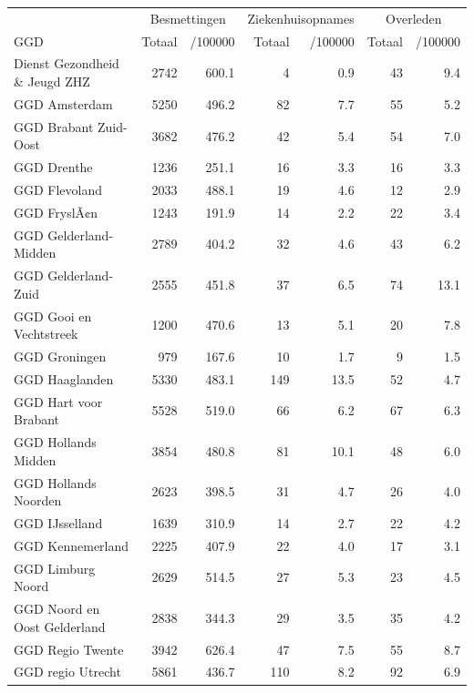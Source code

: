 \documentclass[
  english,
  man,floatsintext]{apa6}
\begin{document}
\begin{table}[H]
\centering\begingroup\fontsize{10}{12}\selectfont

\begin{threeparttable}
\begin{tabular}{lrrrrrr}
\toprule
\multicolumn{1}{c}{ } & \multicolumn{2}{c}{Besmettingen} & \multicolumn{2}{c}{Ziekenhuisopnames} & \multicolumn{2}{c}{Overleden} \\
\cmidrule(l{3pt}r{3pt}){2-3} \cmidrule(l{3pt}r{3pt}){4-5} \cmidrule(l{3pt}r{3pt}){6-7}
GGD & Totaal & /100000 & Totaal & /100000 & Totaal & /100000\\
\midrule
Dienst Gezondheid \& Jeugd ZHZ & 2742 & 600.1 & 4 & 0.9 & 43 & 9.4\\
GGD Amsterdam & 5250 & 496.2 & 82 & 7.7 & 55 & 5.2\\
GGD Brabant Zuid-Oost & 3682 & 476.2 & 42 & 5.4 & 54 & 7.0\\
GGD Drenthe & 1236 & 251.1 & 16 & 3.3 & 16 & 3.3\\
GGD Flevoland & 2033 & 488.1 & 19 & 4.6 & 12 & 2.9\\
GGD FryslÃ¢n & 1243 & 191.9 & 14 & 2.2 & 22 & 3.4\\
GGD Gelderland-Midden & 2789 & 404.2 & 32 & 4.6 & 43 & 6.2\\
GGD Gelderland-Zuid & 2555 & 451.8 & 37 & 6.5 & 74 & 13.1\\
GGD Gooi en Vechtstreek & 1200 & 470.6 & 13 & 5.1 & 20 & 7.8\\
GGD Groningen & 979 & 167.6 & 10 & 1.7 & 9 & 1.5\\
GGD Haaglanden & 5330 & 483.1 & 149 & 13.5 & 52 & 4.7\\
GGD Hart voor Brabant & 5528 & 519.0 & 66 & 6.2 & 67 & 6.3\\
GGD Hollands Midden & 3854 & 480.8 & 81 & 10.1 & 48 & 6.0\\
GGD Hollands Noorden & 2623 & 398.5 & 31 & 4.7 & 26 & 4.0\\
GGD IJsselland & 1639 & 310.9 & 14 & 2.7 & 22 & 4.2\\
GGD Kennemerland & 2225 & 407.9 & 22 & 4.0 & 17 & 3.1\\
GGD Limburg Noord & 2629 & 514.5 & 27 & 5.3 & 23 & 4.5\\
GGD Noord en Oost Gelderland & 2838 & 344.3 & 29 & 3.5 & 35 & 4.2\\
GGD Regio Twente & 3942 & 626.4 & 47 & 7.5 & 55 & 8.7\\
GGD regio Utrecht & 5861 & 436.7 & 110 & 8.2 & 92 & 6.9\\

\end{tabular}
\end{threeparttable}
\end{table}
\end{document}
